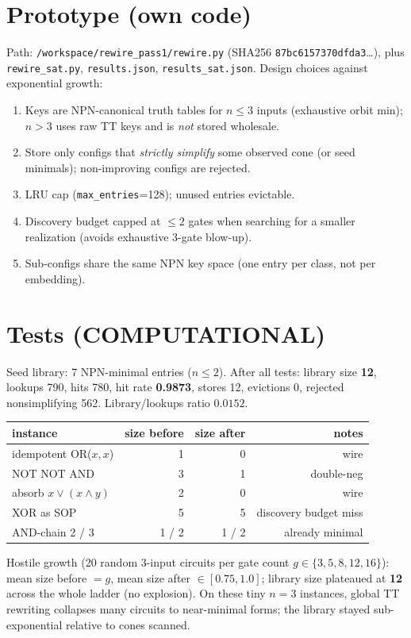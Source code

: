 \documentclass[11pt]{article}
\begin{document}
\section{Prototype (own code)}
Path: \texttt{/workspace/rewire\_pass1/rewire.py} (SHA256 \texttt{87bc6157370dfda3}\ldots), plus \texttt{rewire\_sat.py}, \texttt{results.json}, \texttt{results\_sat.json}.
Design choices against exponential growth:
\begin{enumerate}
\item Keys are NPN-canonical truth tables for $n\le 3$ inputs (exhaustive orbit min); $n>3$ uses raw TT keys and is \emph{not} stored wholesale.
\item Store only configs that \emph{strictly simplify} some observed cone (or seed minimals); non-improving configs are rejected.
\item LRU cap (\texttt{max\_entries}=128); unused entries evictable.
\item Discovery budget capped at $\le 2$ gates when searching for a smaller realization (avoids exhaustive 3-gate blow-up).
\item Sub-configs share the same NPN key space (one entry per class, not per embedding).
\end{enumerate}

\section{Tests (COMPUTATIONAL)}
Seed library: 7 NPN-minimal entries ($n\le 2$). After all tests: library size \textbf{12}, lookups 790, hits 780, hit rate \textbf{0.9873}, stores 12, evictions 0, rejected nonsimplifying 562. Library/lookups ratio $0.0152$.

\begin{center}
\begin{tabular}{lrrr}
\toprule
instance & size before & size after & notes \\
\midrule
idempotent OR($x,x$) & 1 & 0 & wire \\
NOT NOT AND & 3 & 1 & double-neg \\
absorb $x\lor(x\land y)$ & 2 & 0 & wire \\
XOR as SOP & 5 & 5 & discovery budget miss \\
AND-chain 2 / 3 & 1 / 2 & 1 / 2 & already minimal \\
\bottomrule
\end{tabular}
\end{center}

Hostile growth (20 random 3-input circuits per gate count $g\in\{3,5,8,12,16\}$): mean size before $=g$, mean size after $\in[0.75,1.0]$; library size plateaued at \textbf{12} across the whole ladder (no explosion). On these tiny $n{=}3$ instances, global TT rewriting collapses many circuits to near-minimal forms; the library stayed sub-exponential relative to cones scanned.
\end{document}
